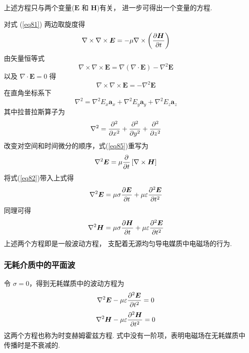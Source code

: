 \documentclass[UTF8,linespread=1.236]{ctexart}
\newcommand\myref[1]{(\ref{#1})}
\newcommand\cu[1]{\boldsymbol{#1}}
\newcommand\vecE{\cu{E}}
\newcommand\vecH{\cu{H}}
\newcommand\pypx[2]{{{\partial {#1}} \over {\partial {#2}}}}
\begin{document}
上述方程只与两个变量($\vecE$ 和 $\vecH$)有关，
进一步可得出一个变量的方程.

对式 \myref{eq81} 两边取旋度得
\begin{equation}\label{eq85}
    \nabla \times \nabla \times \vecE
    =
    - \mu \nabla \times \left( \pypx{\vecH}{t} \right)
\end{equation}
由矢量恒等式
\begin{equation}
    \nabla \times \nabla \times \vecE
    =
    \nabla(\nabla \cdot \vecE)
    -
    \nabla^2\vecE
\end{equation}
以及 $\nabla \cdot \vecE = 0$ 得
\begin{equation}
    \nabla \times \nabla \times \vecE = - \nabla^2\vecE
\end{equation}
在直角坐标系下
\begin{equation}
    \nabla^2 =
    \nabla^2E_x\cu{a}_x +
    \nabla^2E_y\cu{a}_y +
    \nabla^2E_z\cu{a}_z
\end{equation}
其中拉普拉斯算子为
\begin{equation}
    \nabla^2 = \pypx{^2}{x^2} + \pypx{^2}{y^2} + \pypx{^2}{z^2}
\end{equation}
改变对空间和时间微分的顺序，式\myref{eq85}重写为
\begin{equation*}
    \nabla^2\vecE = \mu \pypx{}{t}\left[ \nabla \times \vecH \right]
\end{equation*}
将式\myref{eq82}带入上式得
\begin{equation}
    \nabla^2\vecE = 
    \mu \sigma \pypx{\vecE}{t} + \mu \varepsilon \pypx{^2\vecE}{t^2}
\end{equation}
同理可得
\begin{equation}
    \nabla^2\vecH = 
    \mu \sigma \pypx{\vecH}{t} + \mu \varepsilon \pypx{^2\vecE}{t^2}
\end{equation}
上述两个方程即是一般波动方程，
支配着无源均匀导电媒质中电磁场的行为.

\subsubsection{无耗介质中的平面波}
令 $\sigma = 0$，得到无耗媒质中的波动方程为
\begin{equation}
    \nabla^2 \vecE - \mu\varepsilon\pypx{^2\vecE}{t^2} = 0
\end{equation}
\begin{equation}
    \nabla^2 \vecH - \mu\varepsilon\pypx{^2\vecH}{t^2} = 0
\end{equation}
这两个方程也称为时变赫姆霍兹方程.
式中没有一阶项，表明电磁场在无耗媒质中传播时是不衰减的.
\end{document}
